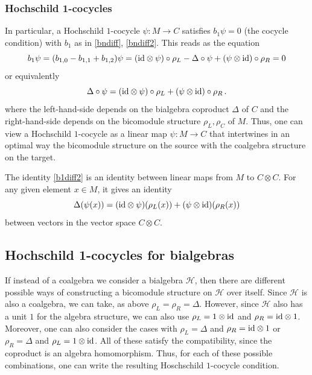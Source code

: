 \documentclass[12pt]{amsart}
\numberwithin{equation}{section}
\def\cH{{\mathcal H}}
\begin{document}
\smallskip
\subsubsection{Hochschild 1-cocycles}

In particular, a Hochschild $1$-cocycle $\psi : M \to C$ satisfies $b_1 \psi =0$ (the cocycle condition) with
$b_1$ as in \eqref{bndiff}, \eqref{bndiff2}. This reads as the equation
\begin{equation}\label{b1diff}
b_1\psi=(b_{1,0}-b_{1,1}+b_{1,2})\psi = ({\rm id}\otimes\psi)\circ \rho_L - \Delta \circ \psi + (\psi \otimes {\rm id}) \circ \rho_R = 0
\end{equation}
or equivalently
\begin{equation}\label{b1diff2}
\Delta \circ \psi = ({\rm id}\otimes\psi)\circ \rho_L  + (\psi \otimes {\rm id}) \circ \rho_R \, . 
\end{equation}
where the left-hand-side depends on the bialgebra coproduct $\Delta$ of $C$ and the right-hand-side
depends on the bicomodule structure $\rho_L, \rho_C$ of $M$. Thus, one can view a 
Hochschild $1$-cocycle  as a linear map $\psi : M \to C$ that intertwines in an optimal way
the bicomodule structure on the source with the coalgebra structure on the target. 

The identity \eqref{b1diff2} is an identity between linear maps from $M$ to $C \otimes C$.
For any given element $x\in M$, it gives an identity
$$ \Delta(\psi(x)) = ({\rm id}\otimes\psi)(\rho_L(x))  + (\psi \otimes {\rm id})(\rho_R(x)) $$
between vectors in the vector space $C\otimes C$.

\smallskip
\subsection{Hochschild 1-cocycles for bialgebras}\label{bialgHH1sec}

If instead of a coalgebra we consider a bialgebra $\cH$, then there are different possible ways of constructing
a bicomodule structure on $\cH$ over itself. Since $\cH$ is also a coalgebra, we can take, as above
$\rho_L=\rho_R=\Delta$. However, since $\cH$ also has a unit $1$ for the algebra structure, we can
also use $\rho_L=1\otimes {\rm id}$ and $\rho_R = {\rm id}\otimes 1$. Moreover, one can also
consider the cases with $\rho_L=\Delta$ and $\rho_R = {\rm id}\otimes 1$ or 
$\rho_R=\Delta$ and $\rho_L=1\otimes {\rm id}$. All of these satisfy the compatibility, since the
coproduct is an algebra homomorphism. Thus, for each of these possible combinations, one
can write the resulting Hoschschild $1$-cocycle condition.
\end{document}
